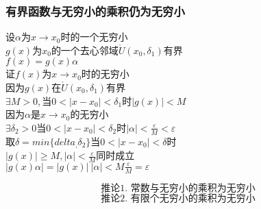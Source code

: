 \subsubsection{有界函数与无穷小的乘积仍为无穷小}
\begin{center}
    设$\alpha$为$x\rightarrow x_0$时的一个无穷小\\
$g(x)$为$x_0$的一个去心邻域$\mathring{U}(x_0,\delta_1)$有界\\
$f(x)=g(x)\alpha$\\
证$f(x)$为$x\rightarrow x_0$时的无穷小\\
因为$g(x)\mbox{在}\mathring{U}(x_0,\delta_1)$有界\\
$\exists M>0,\mbox{当}0<\left|x-x_0\right|<\delta_1$时$\left|g(x)\right|<M$\\
因为$\alpha$是$x\rightarrow x_0$的无穷小\\
$\exists\delta_2>0\mbox{当}0<\left|x-x_0\right|<\delta_2$时$\left|\alpha\right|<\frac{\varepsilon}{M}<\varepsilon$\\
取$\delta=min\{delta_,\delta_2\}$当$0<\left|x-x_0\right|<\delta$时\\
$\left|g(x)\right|\geqslant M,\left|\alpha\right|<\frac{\varepsilon}{M}$同时成立\\
$\left|g(x)\alpha\right|=\left|g(x)\right|\ \left|\alpha\right|<M\frac{\varepsilon}{M}=\varepsilon$
\end{center}
$$\mbox{推论1.\ 常数与无穷小的乘积为无穷小}$$
$$\mbox{推论2.\ 有限个无穷小的乘积为无穷小}$$
